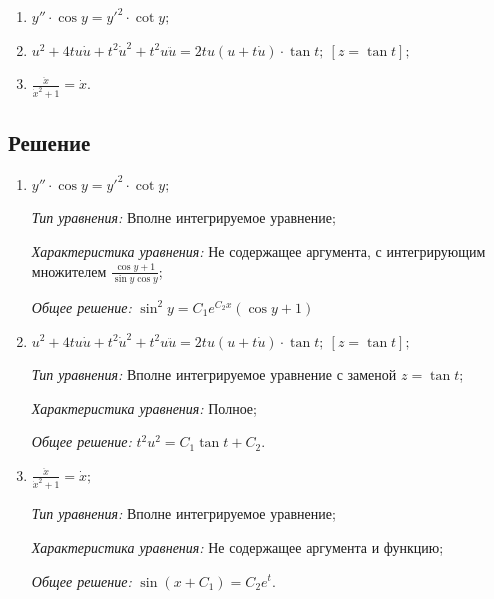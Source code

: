 \documentclass[14pt, a4paper, titlepage, fleqn]{extarticle}
\begin{document}
            \begin{enumerate}
                \item \( y'' \cdot \cos{y} = y'^2 \cdot \cot{y}; \)
                \item \( u^2 + 4tu \dot{u} + t^2 \dot{u}^2 + t^2 u \ddot{u} = 2tu \left( u + t \dot{u} \right) \cdot \tan{t}; ~ [z = \tan{t}]; \)
                \item \( \frac{\ddot{x}}{\dot{x}^2 + 1} = \dot{x}. \)
            \end{enumerate}

        
        \subsection{Решение}
            \begin{enumerate}
                \item \( y'' \cdot \cos{y} = y'^2 \cdot \cot{y}; \)
                    
                    \textit{Тип уравнения:} 
                        Вполне интегрируемое уравнение;

                    \textit{Характеристика уравнения:}
                        Не содержащее аргумента,  с интегрирующим множителем \( \frac{\cos{y} + 1}{\sin{y}\cos{y}} \);

                    \textit{Общее решение:} \( \sin^2{y} = C_1 e^{C_2 x} \left( \cos{y}+1 \right) \)

                \item \( u^2 + 4tu \dot{u} + t^2 \dot{u}^2 + t^2 u \ddot{u} = 2tu \left( u + t \dot{u} \right) \cdot \tan{t}; ~ [z = \tan{t}]; \)
                
                    \textit{Тип уравнения:} 
                        Вполне интегрируемое уравнение с заменой \( z = \tan{t} \);

                    \textit{Характеристика уравнения:}
                        Полное;

                    \textit{Общее решение:} \( t^2u^2 = C_1 \tan{t} + C_2. \)

                \item \( \frac{\ddot{x}}{\dot{x}^2 + 1} = \dot{x}; \)
                                
                    \textit{Тип уравнения:} 
                        Вполне интегрируемое уравнение;

                    \textit{Характеристика уравнения:}
                        Не содержащее аргумента и функцию;

                    \textit{Общее решение:} \( \sin\left(x + C_1\right) = C_2 e^t. \)
                    


            \end{enumerate}
\end{document}
